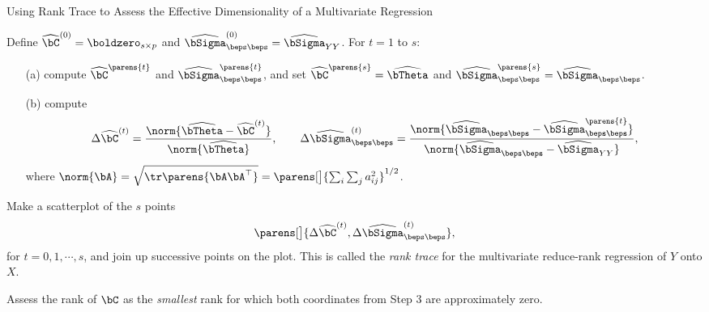 \documentclass[12pt]{article}
\begin{document}
\begin{enumerate}[label=\textbf{\arabic*.}]
\begin{enumerate}
\begin{enumerate}
			\begin{minipage}{\linewidth}
			\begin{algorithm}[H]
			\caption{Using Rank Trace to Assess the Effective Dimensionality of a Multivariate Regression}\label{algo-trace-rank}
				\begin{algorithmic}[1]
				\STATE Define $\widehat{\bC}^{(0)} = \boldzero_{s \times p}$ and $\widehat{\bSigma}_{\beps \beps}^{(0)} = \widehat{\bSigma}_{YY}$. 
				\STATE For $t = 1$ to $s$: 
				\begin{enumerate}
					\item[(a)] compute $\widehat{\bC}^{\parens{t}}$ and $\widehat{\bSigma}_{\beps \beps}^{\parens{t}}$, and set $\widehat{\bC}^{\parens{s}} = \widehat{\bTheta}$ and $\widehat{\bSigma}_{\beps \beps}^{\parens{s}} = \widehat{\bSigma}_{\beps \beps}$. 
					\item[(b)] compute
					\begin{align*}
						\Delta \widehat{\bC}^{(t)} = \frac{\norm{\widehat{\bTheta} - \widehat{\bC}^{(t)}}}{\norm{\widehat{\bTheta}}}, \qquad \Delta \widehat{\bSigma}_{\beps \beps}^{(t)} = \frac{\norm{\widehat{\bSigma}_{\beps \beps} - \widehat{\bSigma}_{\beps \beps}^{\parens{t}}}}{\norm{\widehat{\bSigma}_{\beps \beps} - \widehat{\bSigma}_{YY}}}, 
					\end{align*} 
					where $\norm{\bA} = \sqrt{\tr \parens{\bA \bA^\top}} = \parens[\big]{\sum_{i} \sum_{j} a_{ij}^2}^{1/2}$. 
				\end{enumerate}
				\STATE Make a scatterplot of the $s$ points 
				\begin{align*}
					\parens[\big]{\Delta \widehat{\bC}^{(t)}, \Delta \widehat{\bSigma}_{\beps \beps}^{(t)}}, 
				\end{align*}
				for $t = 0, 1, \cdots, s$, and join up successive points on the plot. This is called the \textit{rank trace} for the multivariate reduce-rank regression of $Y$ onto $X$. 
				
				\STATE Assess the rank of $\bC$ as the \textit{smallest} rank for which both coordinates from Step 3 are approximately zero. 
				
				\end{algorithmic}
			\end{algorithm}
			\end{minipage}
			
			\vspace{10pt}
			

\end{enumerate}
\end{enumerate}
\end{enumerate}
\end{document}
